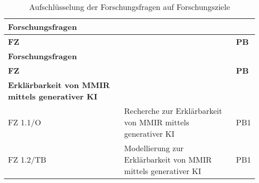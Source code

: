 {
    \def\arraystretch{1.1}%
    \begin{xltabular}{\linewidth}{
            @{}
            >{
                \linewidth
                \raggedright\arraybackslash
            }X
            >{
                \linewidth
                \raggedright\arraybackslash
            }X
            >{
                \linewidth
                \centering\arraybackslash
            }X
            @{}
    }


    \caption{Aufschlüsselung der Forschungsfragen auf Forschungsziele} 
    \label{sec1:intro:table:research-questions} \\
        
    \toprule
    {
        \textbf{Forschungsfragen}
    } \\ 
    \midrule
         
    \textbf{FZ} &  & \textbf{PB} \\ 
    \midrule
    
    \endfirsthead


    \toprule
    {
        \textbf{Forschungsfragen}
    } \\ 
    \midrule
         
    \textbf{FZ} &  & \textbf{PB} \\ 
    \midrule
    
    \endhead
        

    {
        \textbf{Erklärbarkeit von MMIR mittels generativer KI}
    } \\ \midrule

    FZ 1.1/O 
    & 
    Recherche zur Erklärbarkeit von MMIR mittels generativer KI
    & PB1 \\

    \midrule

    FZ 1.2/TB 
    & 
    Modellierung zur Erklärbarkeit von MMIR mittels generativer KI
    & PB1 \\


\end{xltabular}}
